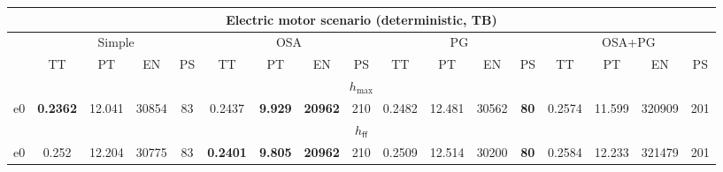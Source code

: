\begin{tabular}{||c||c|c|c|c|c|c|c|c|c|c|c|c|c|c|c|c||}%
\multicolumn{17}{c}{\textbf{Electric motor scenario (deterministic, TB)}}\\%
\hline%
&\multicolumn{4}{|c|}{\small{Simple}}&\multicolumn{4}{|c|}{\small{OSA}}&\multicolumn{4}{|c|}{\small{PG}}&\multicolumn{4}{|c|}{\small{OSA+PG}}\\%
\hline%
&\small{TT}&\small{PT}&\small{EN}&\small{PS}&\small{TT}&\small{PT}&\small{EN}&\small{PS}&\small{TT}&\small{PT}&\small{EN}&\small{PS}&\small{TT}&\small{PT}&\small{EN}&\small{PS}\\%
\hline%
\multicolumn{17}{||c||}{$h_{\max}$}\\%
\hline%
e0&\small{\textbf{0.2362}}&\small{12.041}&\small{30854}&\small{83}&\small{0.2437}&\small{\textbf{9.929}}&\small{\textbf{20962}}&\small{210}&\small{0.2482}&\small{12.481}&\small{30562}&\small{\textbf{80}}&\small{0.2574}&\small{11.599}&\small{320909}&\small{201}\\%
\hline%
\multicolumn{17}{||c||}{$h_{\mathsf{ff}}$}\\%
\hline%
e0&\small{0.252}&\small{12.204}&\small{30775}&\small{83}&\small{\textbf{0.2401}}&\small{\textbf{9.805}}&\small{\textbf{20962}}&\small{210}&\small{0.2509}&\small{12.514}&\small{30200}&\small{\textbf{80}}&\small{0.2584}&\small{12.233}&\small{321479}&\small{201}\\%
\hline%
\end{tabular}